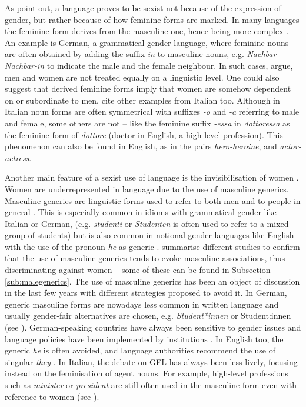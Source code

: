 As \textcite[167]{stahlberg2007representation} point out, a language proves to be sexist not because of the expression of gender, but rather because of how feminine forms are marked. In many languages the feminine form derives from the masculine one, hence being more complex \citep[167]{stahlberg2007representation}. An example is German, a grammatical gender language, where feminine nouns are often obtained by adding the suffix \textit{in} to masculine nouns, e.g. \textit{Nachbar} – \textit{Nachbar-in} to indicate the male and the female neighbour. In such cases, \textcite[167]{stahlberg2007representation} argue, men and women are not treated equally on a linguistic level. One could also suggest that derived feminine forms imply that women are somehow dependent on or subordinate to men. \textcite[8]{menegatti2017gender} cite other examples from Italian too. Although in Italian noun forms are often symmetrical with suffixes \textit{-o} and \textit{-a} referring to male and female, some others are not -- like the feminine suffix \textit{-essa} in \textit{dottoressa} as the feminine form of \textit{dottore} (doctor in English, a high-level profession). This phenomenon can also be found in English, as in the pairs \textit{hero-heroine}, and \textit{actor-actress}. 

Another main feature of a sexist use of language is the invisibilisation of women \citep[13]{weatherall2002gender}. Women are underrepresented in language due to the use of masculine generics. Masculine generics are linguistic forms used to refer to both men and to people in general \citep[169]{stahlberg2007representation}. This is especially common in idioms with grammatical gender like Italian or German, (e.g. \textit{studenti} or \textit{Studenten} is often used to refer to a mixed group of students) but is also common in notional gender languages like English with the use of the pronoun \textit{he} as generic \citep[9]{menegatti2017gender}. \textcite[175f]{stahlberg2007representation} summarise different studies to confirm that the use of masculine generics tends to evoke masculine associations, thus discriminating against women -- some of these can be found in Subsection \ref{sub:malegenerics}. The use of masculine generics has been an object of discussion in the last few years with different strategies proposed to avoid it. In German, generic masculine forms are nowadays less common in written language and usually gender-fair alternatives are chosen, e.g. \textit{Student*innen} or Student:innen (see \cite{boka2021richtlinie}). German-speaking countries have always been sensitive to gender issues and language policies have been implemented by institutions \citep[5]{sczesny2016can}. In English too, the generic \textit{he} is often avoided, and language authorities recommend the use of singular \textit{they} \citep{apasingularthey}. In Italian, the debate on GFL has always been less lively, focusing instead on the feminisation of agent nouns. For example, high-level professions such as \textit{minister} or \textit{president} are still often used in the masculine form even with reference to women (see \cite{gheno2019femminili}).


